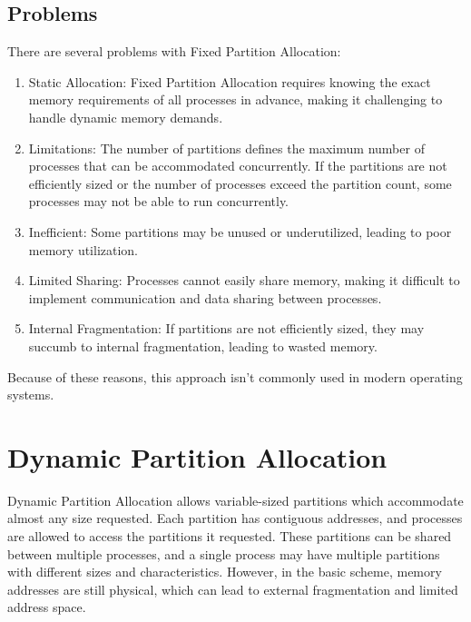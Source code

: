 \documentclass{report}
\begin{document}
\subsection{Problems}
There are several problems with Fixed Partition Allocation:
\begin{enumerate}[label=\textit{(\roman*)}]
\item Static Allocation: Fixed Partition Allocation requires knowing the exact memory requirements
  of all processes in advance, making it challenging to handle dynamic memory demands.
\item Limitations: The number of partitions defines the maximum number of processes that can be
  accommodated concurrently. If the partitions are not efficiently sized or the number of processes
  exceed the partition count, some processes may not be able to run concurrently.
\item Inefficient: Some partitions may be unused or underutilized, leading to poor memory
  utilization.
\item Limited Sharing: Processes cannot easily share memory, making it difficult to implement
  communication and data sharing between processes.
\item Internal Fragmentation: If partitions are not efficiently sized, they may succumb to internal
  fragmentation, leading to wasted memory.
\end{enumerate}
Because of these reasons, this approach isn't commonly used in modern operating systems.


\section{Dynamic Partition Allocation}
Dynamic Partition Allocation allows variable-sized partitions which accommodate almost any size
requested. Each partition has contiguous addresses, and processes are allowed to access the
partitions it requested. These partitions can be shared between multiple processes, and a single
process may have multiple partitions with different sizes and characteristics. However, in the basic
scheme, memory addresses are still physical, which can lead to external fragmentation and limited
address space. 
\end{document}
